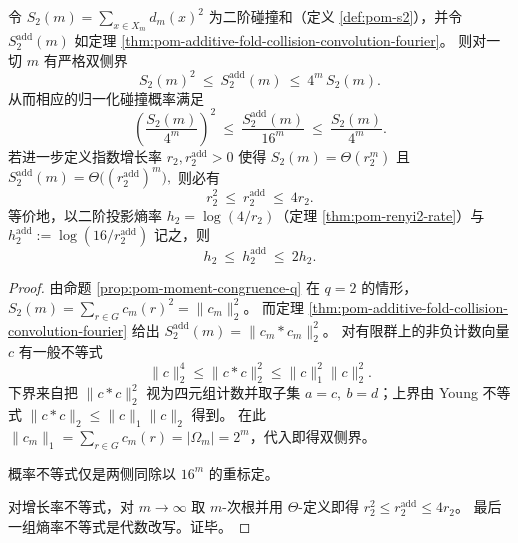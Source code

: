 \begin{proposition}\label{prop:pom-additive-fold-collision-bounds}
令 \(S_2(m)=\sum_{x\in X_m}d_m(x)^2\) 为二阶碰撞和（定义 \ref{def:pom-s2}），并令 \(S_2^{\mathrm{add}}(m)\) 如定理 \ref{thm:pom-additive-fold-collision-convolution-fourier}。
则对一切 \(m\) 有严格双侧界
\[
\boxed{\;
S_2(m)^2\ \le\ S_2^{\mathrm{add}}(m)\ \le\ 4^m\,S_2(m).\;}
\]
从而相应的归一化碰撞概率满足
\[
\left(\frac{S_2(m)}{4^m}\right)^2
\ \le\
\frac{S_2^{\mathrm{add}}(m)}{16^m}
\ \le\
\frac{S_2(m)}{4^m}.
\]
若进一步定义指数增长率 \(r_2,r_2^{\mathrm{add}}>0\) 使得
\(
S_2(m)=\Theta(r_2^m)
\)
且
\(
S_2^{\mathrm{add}}(m)=\Theta\big((r_2^{\mathrm{add}})^m\big),
\)
则必有
\[
\boxed{\;
r_2^2\ \le\ r_2^{\mathrm{add}}\ \le\ 4r_2.\;}
\]
等价地，以二阶投影熵率 \(h_2=\log(4/r_2)\)（定理 \ref{thm:pom-renyi2-rate}）与
\(
h_2^{\mathrm{add}}:=\log(16/r_2^{\mathrm{add}})
\)
记之，则
\[
h_2\ \le\ h_2^{\mathrm{add}}\ \le\ 2h_2.
\]
\end{proposition}
\begin{proof}
由命题 \ref{prop:pom-moment-congruence-q} 在 \(q=2\) 的情形，\(S_2(m)=\sum_{r\in G}c_m(r)^2=\|c_m\|_2^2\)。
而定理 \ref{thm:pom-additive-fold-collision-convolution-fourier} 给出 \(S_2^{\mathrm{add}}(m)=\|c_m*c_m\|_2^2\)。
对有限群上的非负计数向量 \(c\) 有一般不等式
\[
\|c\|_2^4\le \|c*c\|_2^2\le \|c\|_1^2\|c\|_2^2.
\]
下界来自把 \(\|c*c\|_2^2\) 视为四元组计数并取子集 \(a=c,\ b=d\)；上界由 Young 不等式 \(\|c*c\|_2\le \|c\|_1\|c\|_2\) 得到。
在此 \(\|c_m\|_1=\sum_{r\in G}c_m(r)=|\Omega_m|=2^m\)，代入即得双侧界。
\par
概率不等式仅是两侧同除以 \(16^m\) 的重标定。
\par
对增长率不等式，对 \(m\to\infty\) 取 \(m\)-次根并用 \(\Theta\)-定义即得 \(r_2^2\le r_2^{\mathrm{add}}\le 4r_2\)。
最后一组熵率不等式是代数改写。证毕。
\end{proof}

